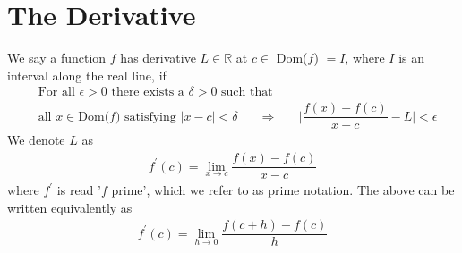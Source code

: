 \section{The Derivative}\label{the_derivative}

\begin{definition}
We say a function $f$ has derivative $L \in \mathbb{R}$ at $c \in$ Dom($f$) $=I$, where $I$ is an interval along the real line, if 
\begin{align*}
    &\text{For all} \hspace{4pt} \epsilon > 0 \hspace{4pt} \text{there exists a} \hspace{4pt} \delta > 0 \hspace{4pt} \text{such that}\\[2ex]
    &\text{all} \hspace{4pt} x \in \text{Dom($f$)} \hspace{4pt} \text{satisfying} \hspace{4pt} \lvert x-c \rvert < \delta \hspace{20pt} \Longrightarrow \hspace{20pt} \Big\lvert \dfrac{f(x)-f(c)}{x-c}-L \Big\rvert < \epsilon
\end{align*}
We denote $L$ as
\begin{align*}
f^{'}(c) = \lim_{x \longrightarrow c} \dfrac{f(x)-f(c)}{x-c}
\end{align*}
where $f^{'}$ is read '$f$ prime', which we refer to as prime notation. The above can be written equivalently as
\begin{align*}
    f^{'}(c) = \lim_{h \longrightarrow 0} \dfrac{f(c+h)-f(c)}{h}
\end{align*}
\end{definition}

